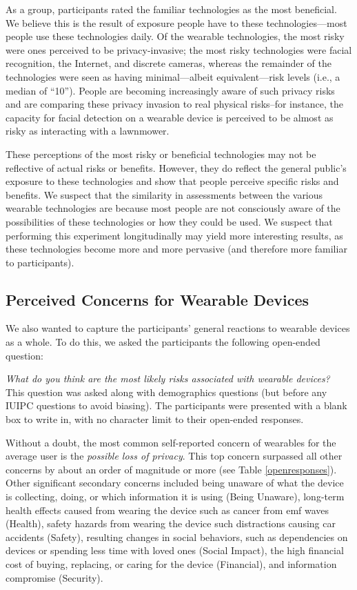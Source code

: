 \documentclass{acm_proc_article-sp}
\begin{document}
As a group, participants rated the familiar technologies as the most beneficial. We believe this is the result of exposure people have to these technologies---most people use these technologies daily. Of the wearable technologies, the most risky were ones perceived to be privacy-invasive; the most risky technologies were facial recognition, the Internet, and discrete cameras, whereas the remainder of the technologies were seen as having minimal---albeit equivalent---risk levels (i.e., a median of ``10''). People are becoming increasingly aware of such privacy risks and are comparing these privacy invasion to real physical risks--for instance, the capacity for facial detection on a wearable device is perceived to be almost as risky as interacting with a lawnmower.

These perceptions of the most risky or beneficial technologies may not be reflective of actual risks or benefits. However, they do reflect the general public's exposure to these technologies and show that people perceive specific risks and benefits. We suspect that the similarity in assessments between the various wearable technologies are because most people are not consciously aware of the possibilities of these technologies or how they could be used. We suspect that performing this experiment longitudinally may yield more interesting results, as these technologies become more and more pervasive (and therefore more familiar to participants).

\subsection{Perceived Concerns for Wearable Devices}
We also wanted to capture the participants' general reactions to wearable devices as a whole. To do this, we asked the participants the following open-ended question:

\textit{What do you think are the most likely risks associated with wearable devices?}\\[-.5cm]

This question was asked along with demographics questions (but before any IUIPC questions to avoid biasing). The participants were presented with a blank box to write in, with no character limit to their open-ended responses. 

Without a doubt, the most common self-reported concern of wearables for the average user is the \textit{possible loss of privacy}. This top concern surpassed all other concerns by about an order of magnitude or more (see Table \ref{openresponses}). Other significant secondary concerns included being unaware of what the device is collecting, doing, or which information it is using (Being Unaware), long-term health effects caused from wearing the device such as cancer from emf waves (Health), safety hazards from wearing the device such distractions causing car accidents (Safety), resulting changes in social behaviors, such as dependencies on devices or spending less time with loved ones (Social Impact), the high financial cost of buying, replacing, or caring for the device (Financial), and information compromise (Security).
\end{document}
